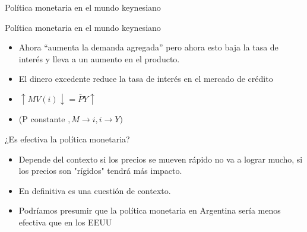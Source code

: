 \documentclass{beamer}
\begin{document}
\begin{frame}{Política monetaria en el mundo keynesiano}
\begin{center}
\begin{figure}[H]
\begin{center}
\begin{minipage}[b]{0.45\textwidth}
\begin{center}
\end{center}
    \end{minipage}
\end{center}
\vspace{0.7cm}
\label{fig:C35.5}
\end{figure}
\end{center}   
\end{frame}


\begin{frame}{Política monetaria en el mundo keynesiano}

\begin{itemize}
    \item Ahora “aumenta la demanda agregada” pero ahora esto baja la tasa de interés y lleva a un aumento en el producto.
    \item El dinero excedente reduce la tasa de interés en el mercado de crédito
    \item $\uparrow M V(i) \downarrow=\bar{P} Y \uparrow$
    \item (P constante $, M \rightarrow i, i \rightarrow Y)$
\end{itemize}
 

\end{frame}


\begin{frame}{¿Es efectiva la política monetaria?}

    \begin{itemize}
        \item Depende del contexto si los precios se mueven rápido no va a lograr mucho, si los precios son "rígidos" tendrá más impacto. 
        \item En definitiva es una cuestión de contexto.
        \item Podríamos presumir que la política monetaria en Argentina sería menos efectiva que en los EEUU

    \end{itemize}
    
\end{frame}
\end{document}
